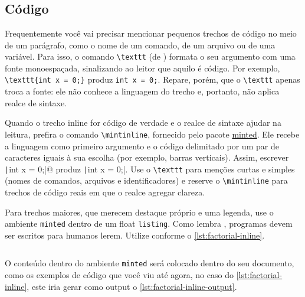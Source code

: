 \chapter{}\label{chap:solucao}

\section{Código}

Frequentemente você vai precisar mencionar pequenos trechos de código no meio de um parágrafo, como o nome de um comando, de um arquivo ou de uma variável. Para isso, o comando \texttt{\textbackslash{}texttt} (de ) formata o seu argumento com uma fonte monoespaçada, sinalizando ao leitor que aquilo é código. Por exemplo, \texttt{\textbackslash{}texttt\{int x = 0;\}} produz \texttt{int x = 0;}. Repare, porém, que o \texttt{\textbackslash{}texttt} apenas troca a fonte: ele não conhece a linguagem do trecho e, portanto, não aplica realce de sintaxe.

Quando o trecho inline for código de verdade e o realce de sintaxe ajudar na leitura, prefira o comando \texttt{\textbackslash{}mintinline}, fornecido pelo pacote \href{https://ctan.org/pkg/minted}{minted}. Ele recebe a linguagem como primeiro argumento e o código delimitado por um par de caracteres iguais à sua escolha (por exemplo, barras verticais). Assim, escrever \texttt@\texttt|int x = 0;|@ produz \texttt|int x = 0;|. Use o \texttt{\textbackslash{}texttt} para menções curtas e simples (nomes de comandos, arquivos e identificadores) e reserve o \texttt{\textbackslash{}mintinline} para trechos de código reais em que o realce agregar clareza.

Para trechos maiores, que merecem destaque próprio e uma legenda, use o ambiente \texttt{minted} dentro de um float \texttt{listing}. Como lembra \textcite{knuth:goto:1974}, programas devem ser escritos para humanos lerem. Utilize conforme o \autoref{lst:factorial-inline}.

\begin{listing}[htb]
  \inputminted{latex}{\CurrentFilePath/res/code/minted.tex}
  \caption{Inclusão de código}
  \label{lst:factorial-inline}
\end{listing}

O conteúdo dentro do ambiente \texttt{minted} será colocado dentro do seu documento, como os exemplos de código que você viu até agora, no caso do \autoref{lst:factorial-inline}, este iria gerar como output o \autoref{lst:factorial-inline-output}.

